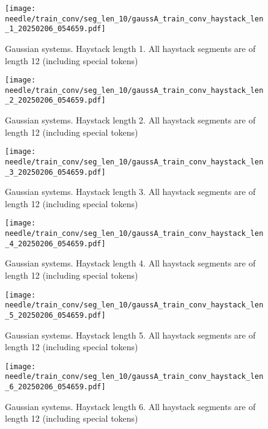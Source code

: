 \begin{figure}
    \centering
    \texttt{[image: needle/train\_conv/seg\_len\_10/gaussA\_train\_conv\_haystack\_len\_1\_20250206\_054659.pdf]}
    \caption{Gaussian systems. Haystack length 1. All haystack segments are of length 12 (including special tokens)}
    \label{fig:gauss_needle_train_conv_haystack_len_1_all_haystack_len_12}
\end{figure}

\begin{figure}
    \centering
    \texttt{[image: needle/train\_conv/seg\_len\_10/gaussA\_train\_conv\_haystack\_len\_2\_20250206\_054659.pdf]}
    \caption{Gaussian systems. Haystack length 2. All haystack segments are of length 12 (including special tokens)}
    \label{fig:gauss_needle_train_conv_haystack_len_2_all_haystack_len_12}
\end{figure}

\begin{figure}
    \centering
    \texttt{[image: needle/train\_conv/seg\_len\_10/gaussA\_train\_conv\_haystack\_len\_3\_20250206\_054659.pdf]}
    \caption{Gaussian systems. Haystack length 3. All haystack segments are of length 12 (including special tokens)}
    \label{fig:gauss_needle_train_conv_haystack_len_3_all_haystack_len_12}
\end{figure}

\begin{figure}
    \centering
    \texttt{[image: needle/train\_conv/seg\_len\_10/gaussA\_train\_conv\_haystack\_len\_4\_20250206\_054659.pdf]}
    \caption{Gaussian systems. Haystack length 4. All haystack segments are of length 12 (including special tokens)}
    \label{fig:gauss_needle_train_conv_haystack_len_4_all_haystack_len_12}

\end{figure}

\begin{figure}
    \centering
    \texttt{[image: needle/train\_conv/seg\_len\_10/gaussA\_train\_conv\_haystack\_len\_5\_20250206\_054659.pdf]}
    \caption{Gaussian systems. Haystack length 5. All haystack segments are of length 12 (including special tokens)}
    \label{fig:gauss_needle_train_conv_haystack_len_5_all_haystack_len_12}
\end{figure}

\begin{figure}
    \centering
    \texttt{[image: needle/train\_conv/seg\_len\_10/gaussA\_train\_conv\_haystack\_len\_6\_20250206\_054659.pdf]}
    \caption{Gaussian systems. Haystack length 6. All haystack segments are of length 12 (including special tokens)}
    \label{fig:gauss_needle_train_conv_haystack_len_6_all_haystack_len_12}
\end{figure}

